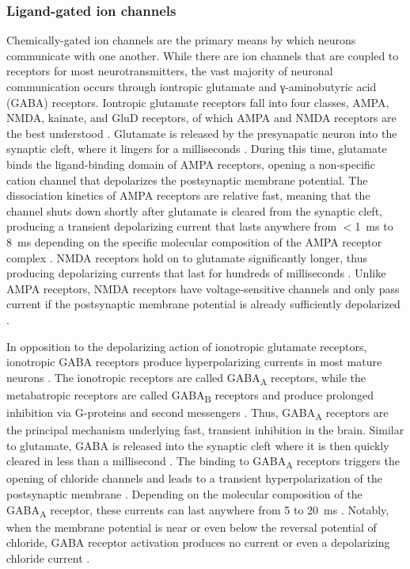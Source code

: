 \subsubsection{Ligand-gated ion channels} \label{sec:I_syn}
Chemically-gated ion channels are the primary means by which neurons communicate with one another. While there are ion channels that are coupled to receptors for most neurotransmitters, the vast majority of neuronal communication occurs through iontropic glutamate and γ-aminobutyric acid (GABA) receptors. Iontropic glutamate receptors fall into four classes, AMPA, NMDA, kainate, and GluD receptors, of which AMPA and NMDA receptors are the best understood \cite{Hansen2021}. Glutamate is released by the presynapatic neuron into the synaptic cleft, where it lingers for a milliseconds \cite{Clements1992}. During this time, glutamate binds the ligand-binding domain of AMPA receptors, opening a non-specific cation channel that depolarizes the postsynaptic membrane potential. The dissociation kinetics of AMPA receptors are relative fast, meaning that the channel shuts down shortly after glutamate is cleared from the synaptic cleft, producing a transient depolarizing current that lasts anywhere from $<$\qty{1}{\milli\second} to \qty{8}{\milli\second} depending on the specific molecular composition of the AMPA receptor complex \cite{Geiger1997,Howe2015,Greger2017}. NMDA receptors hold on to glutamate significantly longer, thus producing depolarizing currents that last for hundreds of milliseconds \cite{Lester1990}. Unlike AMPA receptors, NMDA receptors have voltage-sensitive channels and only pass current if the postsynaptic membrane potential is already sufficiently depolarized \cite{Mayer1984}. 

In opposition to the depolarizing action of ionotropic glutamate receptors, ionotropic GABA receptors produce hyperpolarizing currents in most mature neurons \cite{Farrant2005}. The ionotropic receptors are called GABA\textsubscript{A} receptors, while the metabatropic receptors are called GABA\textsubscript{B} receptors and produce prolonged inhibition via G-proteins and second messengers \cite{Bettler2004}. Thus, GABA\textsubscript{A} receptors are the principal mechanism underlying fast, transient inhibition in the brain. Similar to glutamate, GABA is released into the synaptic cleft where it is then quickly cleared in less than a millisecond \cite{Mozrzymas2003}. The binding to GABA\textsubscript{A} receptors triggers the opening of chloride channels and leads to a transient hyperpolarization of the postsynaptic membrane \cite{Farrant2005}. Depending on the molecular composition of the GABA\textsubscript{A} receptor, these currents can last anywhere from 5 to \qty{20}{\milli\second} \cite{Farrant2005,Bacci2003}. Notably, when the membrane potential is near or even below the reversal potential of chloride, GABA receptor activation produces no current or even a depolarizing chloride current \cite{Alger1979,Andersen1980}.

